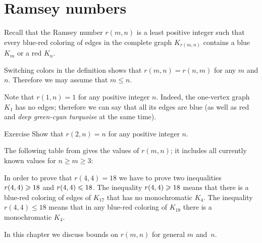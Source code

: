 \chapter{Ramsey numbers}

Recall that the Ramsey number $r(m,n)$ is a least positive integer such that every blue-red coloring of edges in the complete graph $K_{r(m, n)}$ contains a blue $K_m$ or a red $K_n$.

Switching colors in the definition shows that $r(m,n)=r(n,m)$ for any $m$ and $n$.
Therefore we may assume that $m\le n$.

Note that $r(1,n)=1$ for any positive integer $n$.
Indeed, the one-vertex graph $K_1$ has no edges;
therefore we can say that all its edges are blue (as well as red and \emph{deep green-cyan turquoise} at the same time).

\begin{thm}{Exercise}
Show that $r(2,n)=n$ for any positive integer $n$.
\end{thm}

The following table from \cite{radziszowski} gives the values of $r(m,n)$;
it includes all currently known values for $n\ge m\ge 3$:

\begin{table}[h!]\label{ramsey-table}
%
\end{table}

In order to prove that $r(4,4)=18$ we have to prove two inequalities $r(4,4)\z\ge 18$ and $r(4,4)\z\le 18$.
The inequality $r(4,4)\z\ge 18$ means that there is a blue-red coloring of edges of $K_{17}$ that has no monochromatic $K_4$.
The inequality $r(4,4)\le 18$ means that in any blue-red coloring of $K_{18}$ there is a monochromatic $K_4$.

In this chapter we discuss bounds on $r(m,n)$ for general $m$ and~$n$. 


